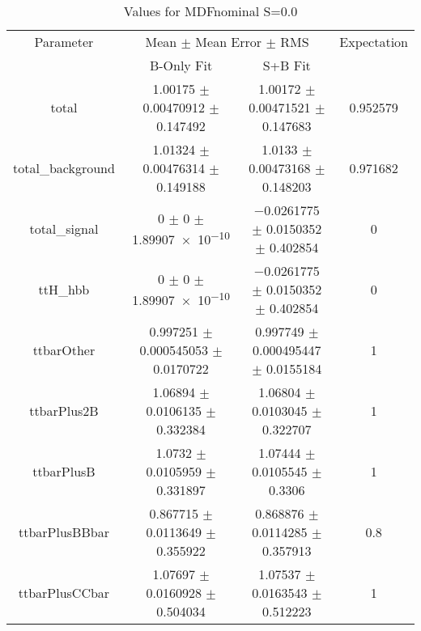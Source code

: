 \begin{table}
\centering
\caption{Values for MDFnominal S=0.0}
\begin{tabular}{cccc}
\toprule
Parameter & \multicolumn{2}{c}{Mean $\pm$ Mean Error $\pm$ RMS} & Expectation\\
 & B-Only Fit & S+B Fit & \\
\midrule
total & \num{1.00175} $\pm$ \num{0.00470912} $\pm$ \num{0.147492} & \num{1.00172} $\pm$ \num{0.00471521} $\pm$ \num{0.147683} & \num{0.952579}\\
total\_background & \num{1.01324} $\pm$ \num{0.00476314} $\pm$ \num{0.149188} & \num{1.0133} $\pm$ \num{0.00473168} $\pm$ \num{0.148203} & \num{0.971682}\\
total\_signal & \num{0} $\pm$ \num{0} $\pm$ \num{1.89907e-10} & \num{-0.0261775} $\pm$ \num{0.0150352} $\pm$ \num{0.402854} & \num{0}\\
ttH\_hbb & \num{0} $\pm$ \num{0} $\pm$ \num{1.89907e-10} & \num{-0.0261775} $\pm$ \num{0.0150352} $\pm$ \num{0.402854} & \num{0}\\
ttbarOther & \num{0.997251} $\pm$ \num{0.000545053} $\pm$ \num{0.0170722} & \num{0.997749} $\pm$ \num{0.000495447} $\pm$ \num{0.0155184} & \num{1}\\
ttbarPlus2B & \num{1.06894} $\pm$ \num{0.0106135} $\pm$ \num{0.332384} & \num{1.06804} $\pm$ \num{0.0103045} $\pm$ \num{0.322707} & \num{1}\\
ttbarPlusB & \num{1.0732} $\pm$ \num{0.0105959} $\pm$ \num{0.331897} & \num{1.07444} $\pm$ \num{0.0105545} $\pm$ \num{0.3306} & \num{1}\\
ttbarPlusBBbar & \num{0.867715} $\pm$ \num{0.0113649} $\pm$ \num{0.355922} & \num{0.868876} $\pm$ \num{0.0114285} $\pm$ \num{0.357913} & \num{0.8}\\
ttbarPlusCCbar & \num{1.07697} $\pm$ \num{0.0160928} $\pm$ \num{0.504034} & \num{1.07537} $\pm$ \num{0.0163543} $\pm$ \num{0.512223} & \num{1}\\
\bottomrule
\end{tabular}
\end{table}